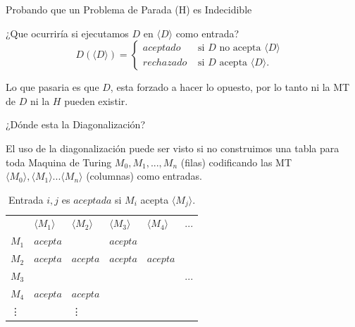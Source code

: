 \documentclass[11pt]{beamer}
\begin{document}
		\begin{frame}{Probando que un Problema de Parada (H) es Indecidible}
		
		    \justifying
		    
		    ¿Que ocurriría si ejecutamos $D$ en $\langle D \rangle$ como entrada?
		    \begin{equation} \label{eq:ocurre}
			    D(\langle D \rangle) = \begin{cases}
                            aceptado & \text{ si $D$ no acepta $\langle D \rangle$ } \\
                            rechazado & \text{ si $D$ acepta $\langle D \rangle$. }
                        \end{cases}
			\end{equation}
			
			Lo que pasaria es que $D$, esta forzado a hacer lo opuesto, por lo tanto ni la MT de $D$ ni la $H$ pueden existir.
			
		\end{frame}
		
		\begin{frame}{¿Dónde esta la Diagonalización?}
		
		    \justifying
		    
		    El uso de la diagonalización puede ser visto si no construimos una tabla para toda Maquina de Turing $M_0, M_1, ... , M_n$ (filas) codificando las MT $\langle M_0 \rangle, \langle M_1 \rangle ... \langle M_n \rangle$ (columnas) como entradas. 
		    
		    
		    \begin{table}[]
              \begin{tabular}{llllll}
                    & $\langle M_1 \rangle$   &  $\langle M_2 \rangle$      & $\langle M_3 \rangle$      & $\langle M_4 \rangle$      & ... \\ \cline{2-6}
              \multicolumn{1}{l|}{$M_1$} & $acepta$ &          & $acepta$ &        &      \\
              \multicolumn{1}{l|}{$M_2$} & $acepta$ & $acepta$ & $acepta$ & $acepta$ &    \\
              \multicolumn{1}{l|}{$M_3$} &        &        &        &        & ...        \\
              \multicolumn{1}{l|}{$M_4$} & $acepta$ & $acepta$ &        &        &        \\
              \multicolumn{1}{l|}{\vdots}   &        & \vdots     &        &        &    
              \end{tabular}
              \caption{Entrada $i,j$ es $aceptada$ si $M_i$ acepta $\langle M_j \rangle$.}
               \label{table:acepta}
             \end{table}
			
		\end{frame}
		
\end{document}
